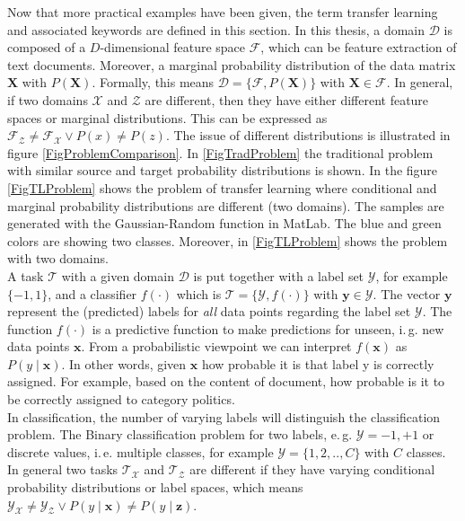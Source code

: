 Now that more practical examples have been given, the term transfer learning and associated keywords are defined in this section.\newline
In this thesis, a domain $\mathcal{D}$ is composed of a $D$-dimensional feature space $\mathcal{F}$, which can be feature extraction of text documents. Moreover, a marginal probability distribution of the data matrix $\mathbf{X}$ with $P(\mathbf{X})$.
Formally, this means $\mathcal{D} = \{\mathcal{F},P(\mathbf{X})\}$ with $\mathbf{X} \in \mathcal{F}$.
In general, if two domains $\mathcal{X}$ and $\mathcal{Z}$ are different, then they have either different feature spaces or marginal distributions.
This can be expressed as $\mathcal{F_{Z}} \neq \mathcal{F_{X}} \vee P(x) \neq \textit{P}(z)$.\cite[p. 542]{Aggarwal.2015}
The issue of different distributions is illustrated in figure \ref{FigProblemComparison}.
In \ref{FigTradProblem} the traditional problem with similar source and target probability distributions is shown.
In the figure \ref{FigTLProblem} shows the problem of transfer learning where conditional and marginal probability distributions are different (two domains).
The samples are generated with the Gaussian-Random function in MatLab.
The blue and green colors are showing two classes.
Moreover, in \ref{FigTLProblem} shows the problem with two domains.\\
A task $\mathcal{T}$ with a given domain $\mathcal{D}$ is put together with a label set $\mathcal{Y}$, for example $\{-1,1\}$, and a classifier $f(\cdot)$ which is  $\mathcal{T} = \{\mathcal{Y},\textit{f}(\cdot)\}$ with $\mathbf{y} \in \mathcal{Y}$.
The vector $\mathbf{y}$ represent the (predicted) labels for \textit{all} data points regarding the label set $\mathcal{Y}$.
The function $f(\cdot)$ is a predictive function to make predictions for unseen, i.\,g. new data points $\mathbf{x}$.
From a probabilistic viewpoint we can interpret $f(\mathbf{x})$ as $P(y\mid \mathbf{x})$.
In other words, given $\mathbf{x}$ how probable it is that label y is correctly assigned.
For example, based on the content of document, how probable is it to be correctly assigned to category politics.\\
In classification, the number of varying labels will distinguish the classification problem.
The Binary classification problem for two labels, e.\,g. $\mathcal{Y} ={-1,+1}$ or discrete values, i.\,e. multiple classes, for example $\mathcal{Y}= \{1,2,..,C\}$ with $C$ classes.
In general two tasks $\mathcal{T_X}$ and $\mathcal{T_{Z}}$ are different if they have varying conditional probability distributions or label spaces, which means $\mathcal{Y_{X}} \neq \mathcal{Y_{Z}} \vee P(y\mid \mathbf{x}) \neq P(y\mid \mathbf{z})$.\cite[p. 542]{Aggarwal.2015}\\ 

